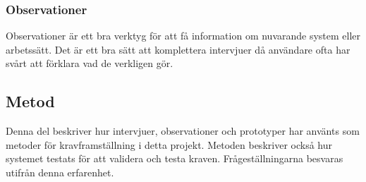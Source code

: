 \subsubsection{Observationer}
Observationer är ett bra verktyg för att få information om nuvarande system eller arbetssätt. Det är ett bra sätt att komplettera intervjuer då användare ofta har svårt att förklara vad de verkligen gör. \cite{Lauesen}
 
\subsection{Metod}
Denna del beskriver hur intervjuer, observationer och prototyper har använts som metoder för kravframställning i detta projekt. Metoden beskriver också hur systemet testats för att validera och testa kraven. Frågeställningarna besvaras utifrån denna erfarenhet.
